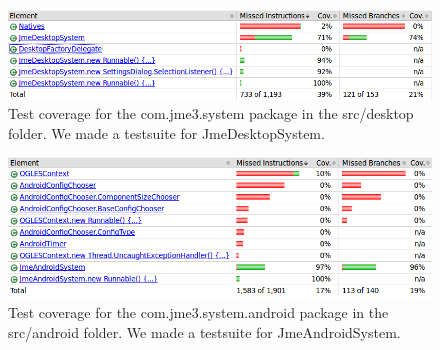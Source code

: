 \documentclass[a4paper, 10pt]{article}
\begin{document}
\begin{figure}[!hb]
\includegraphics[width=\textwidth]{figures/test-coverage-desktop.png}
\caption{Test coverage for the com.jme3.system package in the src/desktop folder. We made a testsuite for JmeDesktopSystem.}
\label{fig:cov-desktop}
\end{figure}

\begin{figure}
\includegraphics[width=\textwidth]{figures/test-coverage-android.png}
\caption{Test coverage for the com.jme3.system.android package in the src/android folder. We made a testsuite for JmeAndroidSystem.}
\label{fig:cov-android}
\end{figure}
\end{document}
